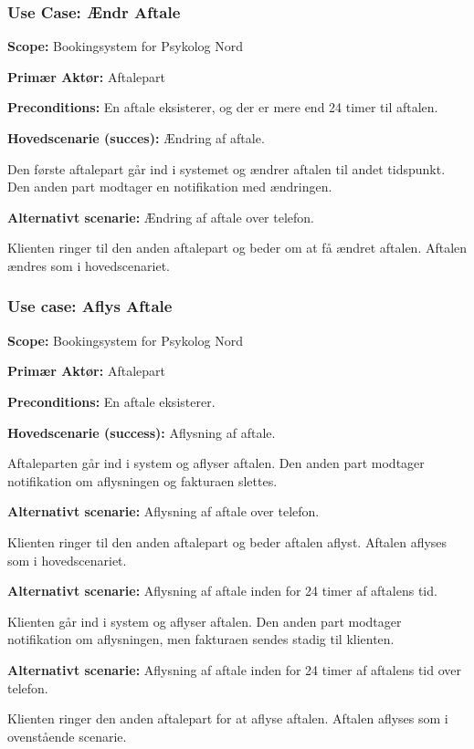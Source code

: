 \subsubsection{Use Case: Ændr Aftale}
{\setlength{\parindent}{0cm}
\textbf{Scope:} Bookingsystem for Psykolog Nord

\textbf{Primær Aktør:} Aftalepart 

\textbf{Preconditions:} En aftale eksisterer, og der er mere end 24 timer til aftalen.

\textbf{Hovedscenarie (succes):} Ændring af aftale.

Den første aftalepart går ind i systemet og ændrer aftalen til andet tidspunkt.
Den anden part modtager en notifikation med ændringen.

\textbf{Alternativt scenarie:} Ændring af aftale over telefon.

Klienten ringer til den anden aftalepart og beder om at få ændret aftalen. Aftalen ændres som i hovedscenariet.
}

\subsubsection{Use case: Aflys Aftale}
{\setlength{\parindent}{0cm}
\textbf{Scope:} Bookingsystem for Psykolog Nord

\textbf{Primær Aktør:} Aftalepart

\textbf{Preconditions:} En aftale eksisterer.

\textbf{Hovedscenarie (success):} Aflysning af aftale.

Aftaleparten går ind i system og aflyser aftalen.
Den anden part modtager notifikation om aflysningen og fakturaen slettes.

\textbf{Alternativt scenarie:} Aflysning af aftale over telefon.

Klienten ringer til den anden aftalepart og beder aftalen aflyst.
Aftalen aflyses som i hovedscenariet.

\textbf{Alternativt scenarie:} Aflysning af aftale inden for 24 timer af aftalens tid.

Klienten går ind i system og aflyser aftalen.
Den anden part modtager notifikation om aflysningen, men fakturaen sendes stadig til klienten.

\textbf{Alternativt scenarie:} Aflysning af aftale inden for 24 timer af aftalens tid over telefon.

Klienten ringer den anden aftalepart for at aflyse aftalen. Aftalen aflyses som i ovenstående scenarie.
}

